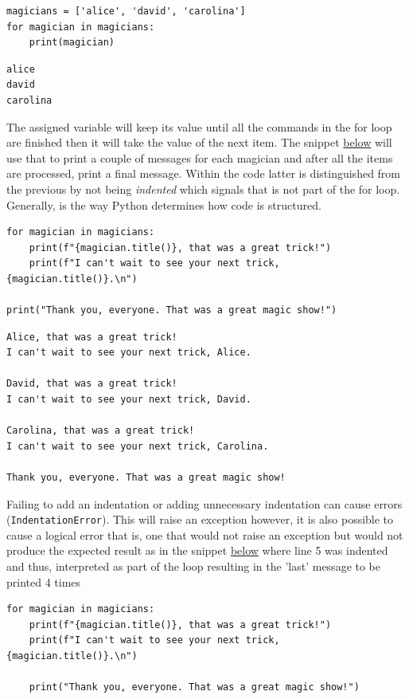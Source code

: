 \documentclass[10pt]{book}
\begin{document}
\label{org738967a}
\begin{verbatim}
magicians = ['alice', 'david', 'carolina']
for magician in magicians:
    print(magician)
\end{verbatim}

\label{orge094aa5}
\begin{verbatim}
alice
david
carolina
\end{verbatim}

The assigned variable will keep its value until all the commands in the for loop are finished then it will take the value of the next item. The snippet \hyperref[orgc0efcfd]{below} will use that to print a couple of messages for each magician and after all the items are processed, print a final message. Within the code latter is distinguished from the previous by not being \emph{indented} which signals that is not part of the for loop. Generally, is the way Python determines how code is structured.

\label{orgc0efcfd}
\begin{verbatim}
for magician in magicians:
    print(f"{magician.title()}, that was a great trick!")
    print(f"I can't wait to see your next trick, {magician.title()}.\n")

print("Thank you, everyone. That was a great magic show!")
\end{verbatim}

\label{orgb3a4710}
\begin{verbatim}
Alice, that was a great trick!
I can't wait to see your next trick, Alice.

David, that was a great trick!
I can't wait to see your next trick, David.

Carolina, that was a great trick!
I can't wait to see your next trick, Carolina.

Thank you, everyone. That was a great magic show!
\end{verbatim}

Failing to add an indentation or adding unnecessary indentation can cause errors (\texttt{IndentationError}). This will raise an exception however, it is also possible to cause a logical error that is, one that would not raise an exception but would not produce the expected result as in the snippet \hyperref[orga1e5a70]{below} where line 5 was indented and thus, interpreted as part of the loop resulting in the 'last' message to be printed 4 times

\label{orga1e5a70}
\begin{verbatim}
for magician in magicians:
    print(f"{magician.title()}, that was a great trick!")
    print(f"I can't wait to see your next trick, {magician.title()}.\n")

    print("Thank you, everyone. That was a great magic show!")
\end{verbatim}
\end{document}
